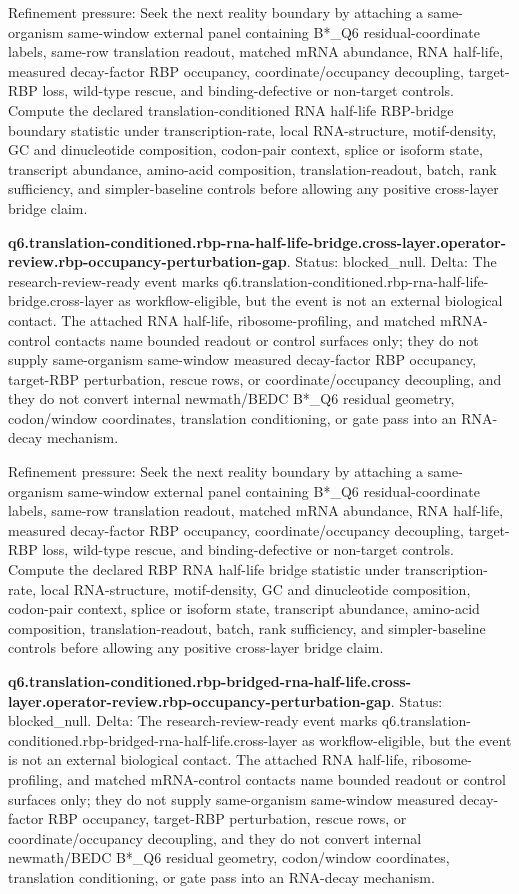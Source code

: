 Refinement pressure: Seek the next reality boundary by attaching a same-organism same-window external panel containing B*\_Q6 residual-coordinate labels, same-row translation readout, matched mRNA abundance, RNA half-life, measured decay-factor RBP occupancy, coordinate/occupancy decoupling, target-RBP loss, wild-type rescue, and binding-defective or non-target controls. Compute the declared translation-conditioned RNA half-life RBP-bridge boundary statistic under transcription-rate, local RNA-structure, motif-density, GC and dinucleotide composition, codon-pair context, splice or isoform state, transcript abundance, amino-acid composition, translation-readout, batch, rank sufficiency, and simpler-baseline controls before allowing any positive cross-layer bridge claim.

\textbf{q6.translation-conditioned.rbp-rna-half-life-bridge.cross-layer.operator-review.rbp-occupancy-perturbation-gap}. Status: blocked\_null. Delta: The research-review-ready event marks q6.translation-conditioned.rbp-rna-half-life-bridge.cross-layer as workflow-eligible, but the event is not an external biological contact. The attached RNA half-life, ribosome-profiling, and matched mRNA-control contacts name bounded readout or control surfaces only; they do not supply same-organism same-window measured decay-factor RBP occupancy, target-RBP perturbation, rescue rows, or coordinate/occupancy decoupling, and they do not convert internal newmath/BEDC B*\_Q6 residual geometry, codon/window coordinates, translation conditioning, or gate pass into an RNA-decay mechanism.

Refinement pressure: Seek the next reality boundary by attaching a same-organism same-window external panel containing B*\_Q6 residual-coordinate labels, same-row translation readout, matched mRNA abundance, RNA half-life, measured decay-factor RBP occupancy, coordinate/occupancy decoupling, target-RBP loss, wild-type rescue, and binding-defective or non-target controls. Compute the declared RBP RNA half-life bridge statistic under transcription-rate, local RNA-structure, motif-density, GC and dinucleotide composition, codon-pair context, splice or isoform state, transcript abundance, amino-acid composition, translation-readout, batch, rank sufficiency, and simpler-baseline controls before allowing any positive cross-layer bridge claim.

\textbf{q6.translation-conditioned.rbp-bridged-rna-half-life.cross-layer.operator-review.rbp-occupancy-perturbation-gap}. Status: blocked\_null. Delta: The research-review-ready event marks q6.translation-conditioned.rbp-bridged-rna-half-life.cross-layer as workflow-eligible, but the event is not an external biological contact. The attached RNA half-life, ribosome-profiling, and matched mRNA-control contacts name bounded readout or control surfaces only; they do not supply same-organism same-window measured decay-factor RBP occupancy, target-RBP perturbation, rescue rows, or coordinate/occupancy decoupling, and they do not convert internal newmath/BEDC B*\_Q6 residual geometry, codon/window coordinates, translation conditioning, or gate pass into an RNA-decay mechanism.

